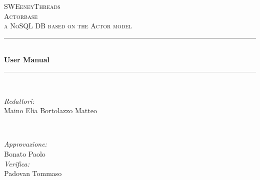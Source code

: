 \documentclass[a4paper]{article}
\begin{document}
	
	\begin{titlepage}
		\newcommand{\HRule}{\rule{\linewidth}{0.5mm}} 
		\center  
		
		\textsc{\LARGE SWEeneyThreads}\\[1.5cm] 
		\textsc{\Large Actorbase}\\[0.5cm] 
		\textsc{\large a NoSQL DB based on the Actor model}\\[0.5cm]
		
		
		\HRule \\[0.4cm]
		{ \huge \bfseries User Manual}\\[0.4cm] 
		\HRule \\[1.5cm]
		
		\begin{minipage}{0.4\textwidth}
			\begin{flushleft} \large
				\emph{Redattori:}\\
				Maino Elia \newline
				Bortolazzo Matteo \\
			\end{flushleft}
		\end{minipage}
		~
		\begin{minipage}{0.4\textwidth}
			\begin{flushright} \large
				\emph{Approvazione:} \\
				Bonato Paolo\\
				\emph{Verifica:} \\
				Padovan Tommaso \\
			\end{flushright}
		\end{minipage}
		

\end{titlepage}
\end{document}
